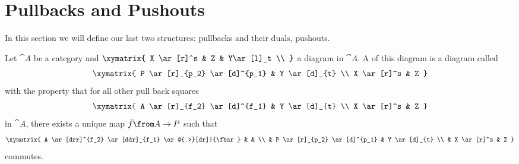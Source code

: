 

\section*{Pullbacks and Pushouts}

In this section we will define our last two structures: pullbacks and their duals, pushouts.

\begin{definition}[Pullback]
  \label{def:pullback}
  Let $\cat{A}$ be a category and
  $ \xymatrix{
    X \ar[r]^s & Z & Y\ar[l]_t \\
  } $
  a diagram in $\cat{A}$.
  A  of this diagram is a diagram called 
  \[ \xymatrix{
    P \ar[r]_{p_2} \ar[d]^{p_1} & Y \ar[d]_{t} \\
    X \ar[r]^s & Z
  } \]
  with the property that for all other pull back squares
  \[ \xymatrix{
    A \ar[r]_{f_2} \ar[d]^{f_1} & Y \ar[d]_{t} \\
    X \ar[r]^s & Z
  } \]
  in $\cat{A}$, there exists a unique map $\fbar\from A \to P$ such that
  \[ \xymatrix{
    A \ar[drr]^{f_2} \ar[ddr]_{f_1} \ar@{.>}[dr]|{\fbar} & & \\
    & P \ar[r]_{p_2} \ar[d]^{p_1} & Y \ar[d]_{t} \\
    & X \ar[r]^s & Z
  } \]
  commutes.
\end{definition}

